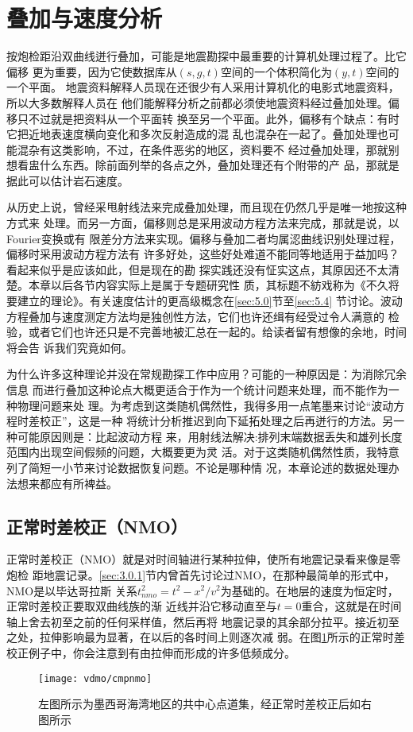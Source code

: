 \section{叠加与速度分析}
\label{sec:3.5}

按炮检距沿双曲线迸行叠加，可能是地震勘探中最重要的计算机处理过程了。比它偏移
更为重要，因为它使数据库从$(s, g, t)$空间的一个体积简化为$(y, t)$空间的一个平面。
地震资料解释人员现在还很少有人采用计算机化的电影式地震资料，所以大多数解释人员在
他们能解释分析之前都必须使地震资料经过叠加处理。偏移只不过就是把资料从一个平面转
换至另一个平面。此外，偏移有个缺点：有时它把近地表速度横向变化和多次反射造成的混
乱也混杂在一起了。叠加处理也可能混杂有这类影响，不过，在条件恶劣的地区，资料要不
经过叠加处理，那就别想看盅什么东西。除前面列举的各点之外，叠加处理还有个附带的产
品，那就是据此可以估计岩石速度。

从历史上说，曾经采甩射线法来完成叠加处理，而且现在仍然几乎是唯一地按这种方式来
处理。而另一方面，偏移则总是采用波动方程方法来完成，那就是说，以Fourier变换或有
限差分方法来实现。偏移与叠加二者均属涊曲线识别处理过程，偏移时采用波动方程方法有
许多好处，这些好处难道不能同等地适用于益加吗？看起来似乎是应该如此，但是现在的勘
探实践还没有怔实这点，其原因还不太清楚。本章以后各节内容实际上是属于专题研究性
质，其标题不紡戏称为《不久将要建立的理论》。有关速度估计的更高级概念在\ref{sec:5.0}节至\ref{sec:5.4}
节讨论。波动方程叠加与速度测定方法均是独创性方法，它们也许还缉有经受过令人满意的
检验，或者它们也许还只是不完善地被汇总在一起的。给读者留有想像的余地，时间将会告
诉我们究竟如何。

为什么许多这种理论并没在常规勘探工作中应用？可能的一种原因是：为消除冗余信息
而进行叠加这种论点大概更适合于作为一个统计问题来处理，而不能作为一种物理问题来处
理。为考虑到这类随机偶然性，我得多用一点笔墨来讨论“波动方程时差校正”，这是一种
将统计分析推迟到向下延拓处理之后再迸行的方法。另一种可能原因则是：比起波动方程
来，用射线法解决:排列末端数据丢失和雄列长度范围内出现空间假频的问题，大概要更为灵
活。对于这类随机偶然性质，我特意列了简短一小节来讨论数据恢复问题。不论是哪种情
况，本章论述的数据处理办法想来都应有所裨益。

\subsection{正常时差校正（NMO）}
\label{sec:3.5.1}

正常时差校正（NMO）就是对时间轴进行某种拉伸，使所有地震记录看来像是零炮检
距地震记录。\ref{sec:3.0.1}节内曾首先讨论过NMO，在那种最简单的形式中，NMO是以毕达哥拉斯
关系$t_{nmo}^2=t^2-x^2/v^2$为基础的。在地层的速度为恒定时，正常时差校正要取双曲线族的渐
近线并沿它移动直至与$t=0$重合，这就是在时间轴上舍去初至之前的任何采样值，然后再将
地震记录的其余部分拉平。接近初至之处，拉伸影响最为显著，在以后的各时间上则逐次减
弱。在图\ref{fig:vdmo/cmpnmo}所示的正常时差校正例子中，你会注意到有由拉伸而形成的许多低频成分。
\begin{figure}[H]
\centering
\texttt{[image: vdmo/cmpnmo]}
\caption[cmpnmo]{左图所示为墨西哥海湾地区的共中心点道集，经正常时差校正后如右图所示}
\label{fig:vdmo/cmpnmo}
\end{figure}

